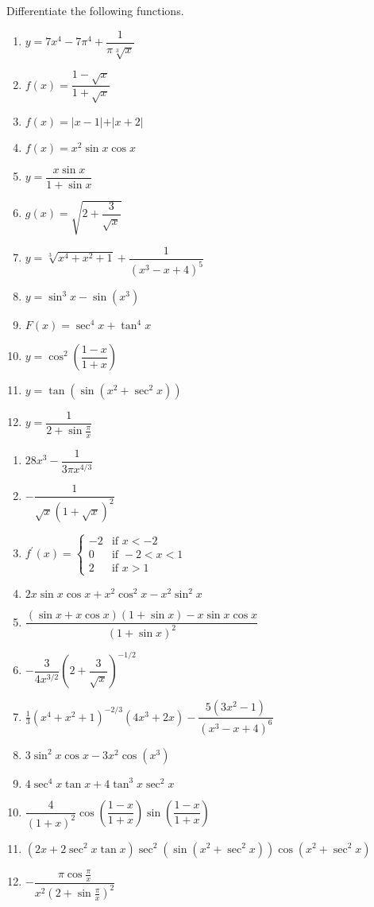 \begin{enumialphparenastyle}
\begin{ex}
Differentiate the following functions.
\begin{enumerate}
	\item	$y=7x^4-7\pi^4+\dfrac{1}{\pi\sqrt[3]{x}}$
	\item	$f(x)=\dfrac{1-\sqrt{x}}{1+\sqrt{x}}$
	\item	$f(x)=\vert x-1\vert+\vert x+2\vert$
	\item	$f(x)=x^2\sin x\cos x$
	\item	$y=\dfrac{x\sin x}{1+\sin x}$
	\item	$g(x)=\sqrt{2+\dfrac{3}{\sqrt{x}}}$
	\item	$y=\sqrt[3]{x^4+x^2+1}+\dfrac{1}{(x^3-x+4)^5}$
	\item	$y=\sin^3 x-\sin(x^3)$
	\item	$F(x)=\sec^4 x+\tan^4 x$
	\item	$y=\cos^2\left(\dfrac{1-x}{1+x}\right)$
	\item	$y=\tan(\sin(x^2+\sec^2 x))$
	\item	$y=\dfrac{1}{2+\sin\frac{\pi}{x}}$
\end{enumerate}
\begin{sol}
\begin{enumerate}
	\item	$28x^3-\dfrac{1}{3\pi x^{4/3}}$
	\item	$-\dfrac{1}{\sqrt{x}(1+\sqrt{x})^2}$
	\item	$f^{\prime}(x)=\left\{ 
	\begin{array}{ll}
	-2 & \text{if }x<-2 \\ 
	0 & \text{if }-2<x<1 \\ 
	2 & \text{if }x>1%
	\end{array}%
	\right. $
	\item	$2x\sin x\cos x+x^2\cos^2 x-x^2\sin^2 x$
	\item	$\dfrac{(\sin x+x\cos x)(1+\sin x)-x\sin x\cos x}{(1+\sin x)^2}$
	\item	$-\dfrac{3}{4x^{3/2}}\left(2+\dfrac{3}{\sqrt{x}}\right)^{-1/2}$
	\item	$\frac{1}{3}(x^4+x^2+1)^{-2/3}(4x^3+2x)-\dfrac{5(3x^2-1)}{(x^3-x+4)^6}$
	\item	$3\sin^2 x\cos x-3x^2\cos(x^3)$
	\item	$4\sec^4 x\tan x + 4\tan^3 x\sec^2 x$
	\item	$\dfrac{4}{(1+x)^2}\cos\left(\dfrac{1-x}{1+x}\right)\sin\left(\dfrac{1-x}{1+x}\right)$
	\item	$(2x+2\sec^2 x\tan x)\sec^2(\sin(x^2+\sec^2 x))\cos(x^2+\sec^2 x)$
	\item	$-\dfrac{\pi\cos\frac{\pi}{x}}{x^2(2+\sin\frac{\pi}{x})^2}$
\end{enumerate}
\end{sol}
\end{ex}


\end{enumialphparenastyle}
